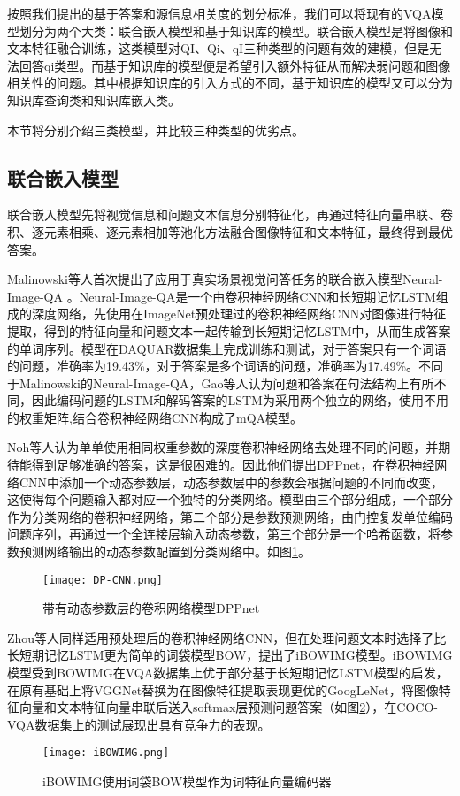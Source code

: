 按照我们提出的基于答案和源信息相关度的划分标准，我们可以将现有的VQA模型划分为两个大类：联合嵌入模型和基于知识库的模型。联合嵌入模型是将图像和文本特征融合训练，这类模型对QI、Qi、qI三种类型的问题有效的建模，但是无法回答qi类型。而基于知识库的模型便是希望引入额外特征从而解决弱问题和图像相关性的问题。其中根据知识库的引入方式的不同，基于知识库的模型又可以分为知识库查询类和知识库嵌入类。

本节将分别介绍三类模型，并比较三种类型的优劣点。

\subsection{联合嵌入模型}
联合嵌入模型先将视觉信息和问题文本信息分别特征化，再通过特征向量串联、卷积、逐元素相乘、逐元素相加等池化方法融合图像特征和文本特征，最终得到最优答案。

Malinowski等人首次提出了应用于真实场景视觉问答任务的联合嵌入模型Neural-Image-QA
。Neural-Image-QA是一个由卷积神经网络CNN和长短期记忆LSTM组成的深度网络，先使用在ImageNet预处理过的卷积神经网络CNN对图像进行特征提取，得到的特征向量和问题文本一起传输到长短期记忆LSTM中，从而生成答案的单词序列。模型在DAQUAR数据集上完成训练和测试，对于答案只有一个词语的问题，准确率为19.43\%，对于答案是多个词语的问题，准确率为17.49\%。不同于Malinowski的Neural-Image-QA，Gao等人认为问题和答案在句法结构上有所不同，因此编码问题的LSTM和解码答案的LSTM为采用两个独立的网络，使用不用的权重矩阵,结合卷积神经网络CNN构成了mQA模型。

Noh等人认为单单使用相同权重参数的深度卷积神经网络去处理不同的问题，并期待能得到足够准确的答案，这是很困难的。因此他们提出DPPnet，在卷积神经网络CNN中添加一个动态参数层，动态参数层中的参数会根据问题的不同而改变，这使得每个问题输入都对应一个独特的分类网络。模型由三个部分组成，一个部分作为分类网络的卷积神经网络，第二个部分是参数预测网络，由门控复发单位编码问题序列，再通过一个全连接层输入动态参数，第三个部分是一个哈希函数，将参数预测网络输出的动态参数配置到分类网络中。如图\ref{DP-CNN}。
\begin{figure}[H]
	\centering
	\texttt{[image: DP-CNN.png]}
	\caption{带有动态参数层的卷积网络模型DPPnet}
	\label{DP-CNN}
\end{figure}

Zhou等人同样适用预处理后的卷积神经网络CNN，但在处理问题文本时选择了比长短期记忆LSTM更为简单的词袋模型BOW，提出了iBOWIMG模型。iBOWIMG模型受到BOWIMG在VQA数据集上优于部分基于长短期记忆LSTM模型的启发，在原有基础上将VGGNet替换为在图像特征提取表现更优的GoogLeNet，将图像特征向量和文本特征向量串联后送入softmax层预测问题答案（如图\ref{iBOWIMG}），在COCO-VQA数据集上的测试展现出具有竞争力的表现。
\begin{figure}[H]
	\centering
	\texttt{[image: iBOWIMG.png]}
	\caption{iBOWIMG使用词袋BOW模型作为词特征向量编码器}
	\label{iBOWIMG}
\end{figure}

